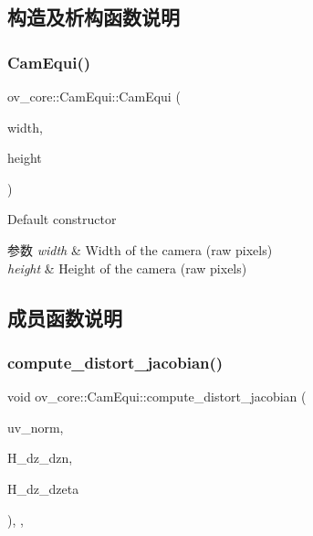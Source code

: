\subsection{构造及析构函数说明}
\mbox{\label{classov__core_1_1CamEqui_aac99e3cb833ebf47a7ba2db390ba5f66}} 
\subsubsection{\texorpdfstring{Cam\+Equi()}{CamEqui()}}
{\footnotesize\ttfamily ov\+\_\+core\+::\+Cam\+Equi\+::\+Cam\+Equi (\begin{DoxyParamCaption}\item[{int}]{width,  }\item[{int}]{height }\end{DoxyParamCaption})\hspace{0.3cm}{\ttfamily [inline]}}



Default constructor 


\begin{DoxyParams}{参数}
{\em width} & Width of the camera (raw pixels) \\
\hline
{\em height} & Height of the camera (raw pixels) \\
\hline
\end{DoxyParams}


\subsection{成员函数说明}
\mbox{\label{classov__core_1_1CamEqui_a68692045d866fbd508a30aab7f3b0637}} 
\subsubsection{\texorpdfstring{compute\+\_\+distort\+\_\+jacobian()}{compute\_distort\_jacobian()}}
{\footnotesize\ttfamily void ov\+\_\+core\+::\+Cam\+Equi\+::compute\+\_\+distort\+\_\+jacobian (\begin{DoxyParamCaption}\item[{const Eigen\+::\+Vector2d \&}]{uv\+\_\+norm,  }\item[{Eigen\+::\+Matrix\+Xd \&}]{H\+\_\+dz\+\_\+dzn,  }\item[{Eigen\+::\+Matrix\+Xd \&}]{H\+\_\+dz\+\_\+dzeta }\end{DoxyParamCaption})\hspace{0.3cm}{\ttfamily [inline]}, {\ttfamily [override]}, {\ttfamily [virtual]}}



